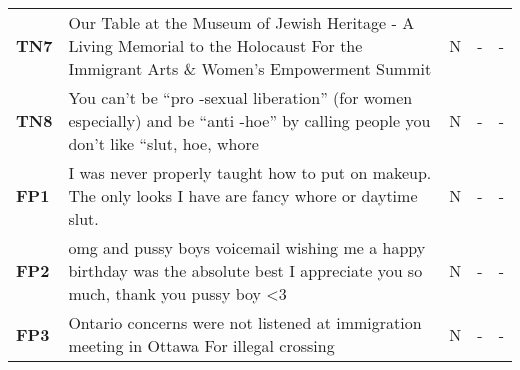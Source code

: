\begin{table}
\begin{tabular}{lp{12cm}ccc}
        \textbf{TN7}      & Our Table at the Museum of Jewish Heritage - A Living Memorial to the Holocaust For the Immigrant Arts \& Women's Empowerment Summit                                                                                                                                                                                                         & N                                        & -                                   & -                                          \\
        \textbf{TN8}      & You can't be “pro -sexual liberation” (for women especially) and be “anti -hoe” by calling people you don't like “slut, hoe, whore                                                                                                                                                                                                           & N                                        & -                                   & -                                          \\
        \textbf{FP1}      & I was never properly taught how to put on makeup. The only looks I have are fancy whore or daytime slut.                                                                                                                                                                                                                                     & N                                        & -                                   & -                                          \\
        \textbf{FP2}      & omg and pussy boys voicemail wishing me a happy birthday was the absolute best I appreciate you so much, thank you pussy boy <3                                                                                                                                                                                                    & N                                        & -                                   & -                                          \\
        \textbf{FP3}      & Ontario concerns were not listened at immigration meeting in Ottawa For illegal crossing                                                                                                                                                                                                                                                     & N                                        & -                                   & -                                          \\

\end{tabular}
\end{table}
